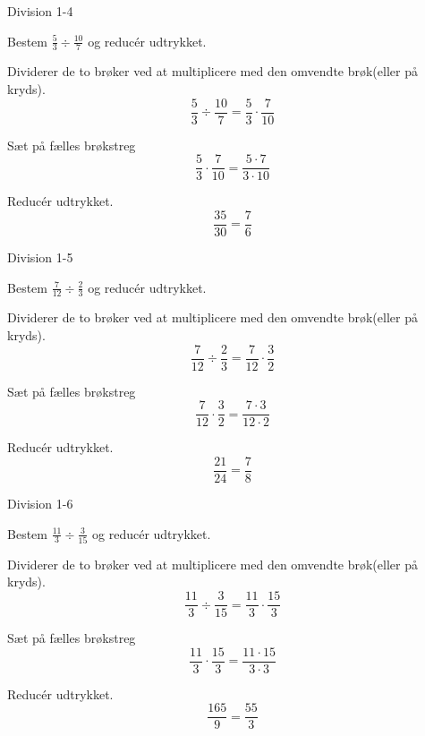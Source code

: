 \documentclass{article}
\begin{document}
\newpage

\begin{exercise}{Division 1-4}
	
	Bestem $\frac{5}{3} \div \frac{10}{7}$ og reducér udtrykket.
	
	
	\hint
	
	Dividerer de to brøker ved at multiplicere med den omvendte brøk(eller på kryds).
	\[
	\frac{5}{3} \div \frac{10}{7} = \frac{5}{3} \cdot \frac{7}{10}
	\]
	
	\hint
	
	Sæt på fælles brøkstreg
	\[
	 \frac{5}{3} \cdot \frac{7}{10} = \frac{5 \cdot 7}{3 \cdot 10}
	\]
	
	\hint
	
	Reducér udtrykket.
	\[
	\frac{35}{30} = \frac{7}{6} 
	\]
	
\end{exercise}


\newpage

\begin{exercise}{Division 1-5}
	
	Bestem $\frac{7}{12} \div \frac{2}{3}$ og reducér udtrykket.
	
	
	\hint
	
	Dividerer de to brøker ved at multiplicere med den omvendte brøk(eller på kryds).
	\[
	\frac{7}{12} \div \frac{2}{3} = \frac{7}{12} \cdot \frac{3}{2}
	\]
	
	\hint
	
	Sæt på fælles brøkstreg
	\[
	\frac{7}{12} \cdot \frac{3}{2} = \frac{7 \cdot 3}{12 \cdot 2}
	\]
	
	\hint
	
	Reducér udtrykket.
	\[
	\frac{21}{24} = \frac{7}{8} 
	\]
	
\end{exercise}

\newpage

\begin{exercise}{Division 1-6}
	
	Bestem $\frac{11}{3} \div \frac{3}{15}$ og reducér udtrykket.
	
	
	\hint
	
	Dividerer de to brøker ved at multiplicere med den omvendte brøk(eller på kryds).
	\[
	\frac{11}{3} \div \frac{3}{15} = \frac{11}{3} \cdot \frac{15}{3}
	\]
	
	\hint
	
	Sæt på fælles brøkstreg
	\[
	\frac{11}{3} \cdot \frac{15}{3} = \frac{11 \cdot 15}{3 \cdot 3}
	\]
	
	\hint
	
	Reducér udtrykket.
	\[
	\frac{165}{9} = \frac{55}{3} 
	\]
	
\end{exercise}
\end{document}
